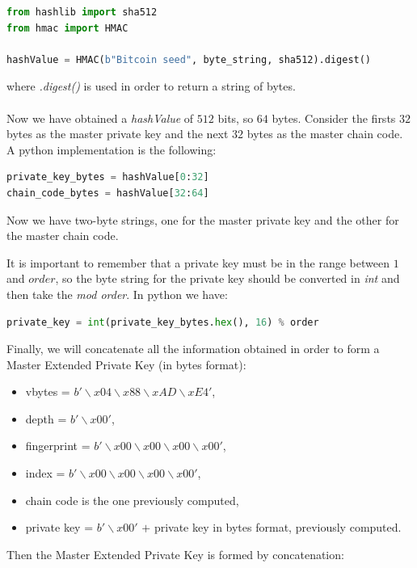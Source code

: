 \begin{lstlisting}[language=Python]
from hashlib import sha512
from hmac import HMAC

hashValue = HMAC(b"Bitcoin seed", byte_string, sha512).digest()
\end{lstlisting}
where \textit{.digest()} is used in order to return a string of bytes.
\\ \\
Now we have obtained a \textit{hashValue} of $512$ bits, so $64$ bytes. Consider the firsts $32$ bytes as the master private key and the next $32$ bytes as the master chain code. A python implementation is the following:

\begin{lstlisting}[language=Python]
private_key_bytes = hashValue[0:32]
chain_code_bytes = hashValue[32:64]
\end{lstlisting}
\begin{flushleft}
	Now we have two-byte strings, one for the master private key and the other for the master chain code.
\end{flushleft}
It is important to remember that a private key must be in the range between $1$ and $order$, so the byte string for the private key should be converted in \textit{int} and then take the \textit{mod order}. In python we have:

\begin{lstlisting}[language=Python]
private_key = int(private_key_bytes.hex(), 16) % order
\end{lstlisting}
\begin{flushleft}
	Finally, we will concatenate all the information obtained in order to form a Master Extended Private Key (in bytes format):
\end{flushleft}

\begin{itemize}
	\item vbytes = $b'\backslash x04\backslash x88\backslash xAD\backslash xE4'$,
	\item depth = $b'\backslash x00'$,
	\item fingerprint = $b'\backslash x00\backslash x00\backslash x00\backslash x00'$,
	\item index = $b'\backslash x00\backslash x00\backslash x00\backslash x00'$,
	\item chain code is the one previously computed,
	\item private key = $b'\backslash x00'$ $+$ private key in bytes format, previously computed.
\end{itemize}
Then the Master Extended Private Key is formed by concatenation:

